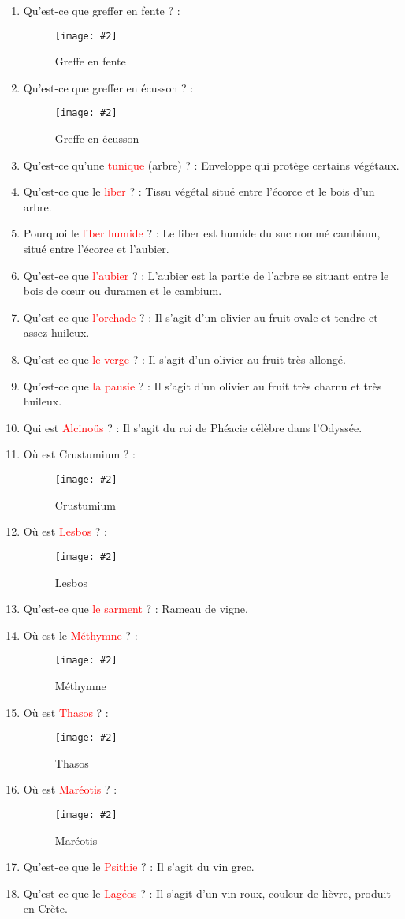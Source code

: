 \documentclass[a4paper, 11pt, hidelinks]{article}
\newcommand{\img}[4]{\begin{figure}[!ht]
    \centering
    \texttt{[image: \#2]}
    \caption{#3}
    \label{#4}
    \end{figure} }
\begin{document}
\begin{enumerate}
            \newpage
      \item Qu'est-ce que greffer en fente ? :
            \img{1.5}{greffe en fente.jpeg}{Greffe en fente}{62}
      \item Qu'est-ce que greffer en écusson ? :
            \img{2.5}{greffe en ecusson.jpeg}{Greffe en écusson}{63}
      \item Qu'est-ce qu'une \textcolor{red}{tunique} (arbre) ? : Enveloppe qui protège certains végétaux.
      \item Qu'est-ce que le \textcolor{red}{liber} ? : Tissu végétal situé entre l'écorce et le bois d'un arbre.
      \item Pourquoi le \textcolor{red}{liber humide} ? : Le liber est humide du suc nommé cambium, situé entre l'écorce et l'aubier.
      \item Qu'est-ce que \textcolor{red}{l'aubier} ? : L'aubier est la partie de l’arbre se situant entre le bois de cœur ou duramen et le cambium.
      \item Qu'est-ce que \textcolor{red}{l'orchade} ? : Il s'agit d'un olivier au fruit ovale et tendre et assez huileux.
      \item Qu'est-ce que \textcolor{red}{le verge} ? : Il s'agit d'un olivier au fruit très allongé.
      \item Qu'est-ce que \textcolor{red}{la pausie} ? : Il s'agit d'un olivier au fruit très charnu et très huileux.
      \item Qui est \textcolor{red}{Alcinoüs} ? : Il s'agit du roi de Phéacie célèbre dans l'Odyssée.
      \item Où est Crustumium ? :
            \img{0.4}{crustumium.png}{Crustumium}{64}
      \item Où est \textcolor{red}{Lesbos} ? :
            \img{0.4}{Lesbos.png}{Lesbos}{65}
            \newpage
      \item Qu'est-ce que \textcolor{red}{le sarment} ? : Rameau de vigne.
      \item Où est le \textcolor{red}{Méthymne} ? :
            \img{0.4}{Methymne.png}{Méthymne}{66}
      \item Où est \textcolor{red}{Thasos} ? :
            \img{0.4}{Thasos.png}{Thasos}{67}
      \item Où est \textcolor{red}{Maréotis} ? :
            \img{0.4}{Mareotis.png}{Maréotis}{68}
      \item Qu'est-ce que le \textcolor{red}{Psithie} ? : Il s'agit du vin grec.
      \item Qu'est-ce que le \textcolor{red}{Lagéos} ? : Il s'agit d'un vin roux, couleur de lièvre, produit en Crète.

\end{enumerate}
\end{document}
